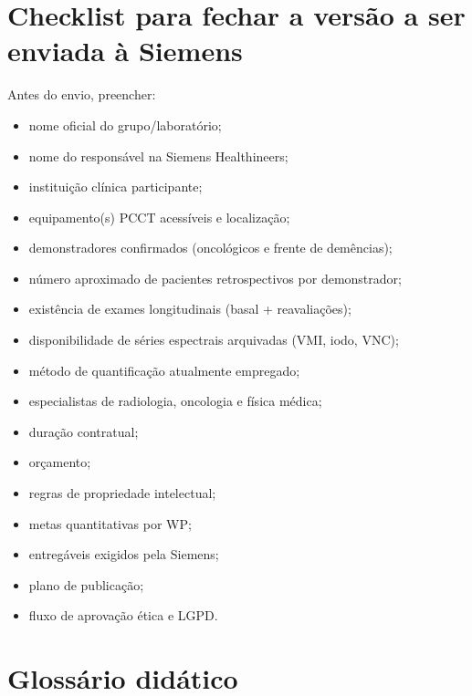 \documentclass[11pt,a4paper]{article}
\begin{document}
\appendix

\section{Checklist para fechar a versão a ser enviada à Siemens}

Antes do envio, preencher:

\begin{itemize}[label=$\square$]
\item nome oficial do grupo/laboratório;
\item nome do responsável na Siemens Healthineers;
\item instituição clínica participante;
\item equipamento(s) PCCT acessíveis e localização;
\item demonstradores confirmados (oncológicos e frente de demências);
\item número aproximado de pacientes retrospectivos por demonstrador;
\item existência de exames longitudinais (basal + reavaliações);
\item disponibilidade de séries espectrais arquivadas (VMI, iodo, VNC);
\item método de quantificação atualmente empregado;
\item especialistas de radiologia, oncologia e física médica;
\item duração contratual;
\item orçamento;
\item regras de propriedade intelectual;
\item metas quantitativas por WP;
\item entregáveis exigidos pela Siemens;
\item plano de publicação;
\item fluxo de aprovação ética e LGPD.
\end{itemize}

\section{Glossário didático}
\end{document}
